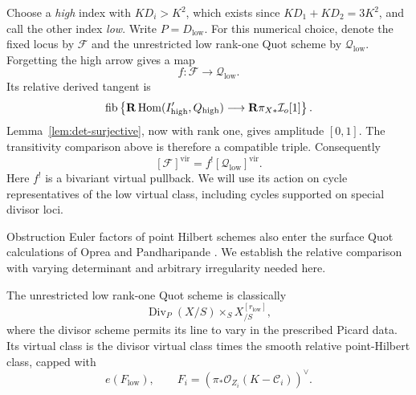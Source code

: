 Choose a \emph{high} index with \(KD_i>K^2\), which exists since
\(KD_1+KD_2=3K^2\), and call the other index \emph{low}.
Write \(P=D_{\mathrm{low}}\).  For this numerical choice, denote the fixed locus by \(\mathcal F\)
and the unrestricted low rank-one Quot scheme by
\(\mathcal Q_{\mathrm{low}}\).  Forgetting the high arrow gives a map
\[
 f:\mathcal F\longrightarrow\mathcal Q_{\mathrm{low}}.
\]
Its relative derived tangent is
\[
 \operatorname{fib}\left\{
 \mathbf R\operatorname{Hom}(I'_{\mathrm{high}},Q_{\mathrm{high}})
 \longrightarrow\mathbf R\pi_{X*}\mathcal I_o[1]\right\}.
\]
Lemma~\ref{lem:det-surjective}, now with rank one, gives amplitude
\([0,1]\). The transitivity comparison above is therefore a compatible
triple.  Consequently
\begin{equation}
\label{eq:fixed-low-pullback}
 [\mathcal F]^{\mathrm{vir}}
   =f^![\mathcal Q_{\mathrm{low}}]^{\mathrm{vir}}.
\end{equation}
Here \(f^!\) is a bivariant virtual pullback.  We will use its action
on cycle representatives of the low virtual class, including cycles
supported on special divisor loci.

Obstruction Euler factors of point Hilbert schemes also enter the
surface Quot calculations of Oprea and Pandharipande
\cite[Lemma~34 and Section~5.2]{OPQuot}. We establish the relative
comparison with varying determinant and arbitrary irregularity needed
here.

\begin{lemma}
\label{lem:point-excess}
The unrestricted low rank-one Quot scheme is classically
\[
 \operatorname{Div}_{P}(X/S)\times_S X^{[r_{\mathrm{low}}]}_{/S},
\]
where the divisor scheme permits its line to vary in the prescribed
Picard data. Its virtual class is the divisor virtual class times the
smooth relative point-Hilbert class, capped with
\begin{equation}
\label{eq:point-obstruction}
 e(F_{\mathrm{low}}),\qquad
 F_i=\left(\pi_*\mathcal O_{Z_i}(K-\mathcal C_i)\right)^\vee.
\end{equation}
\end{lemma}

